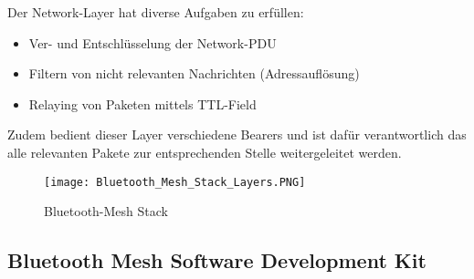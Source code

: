 Der Network-Layer hat diverse Aufgaben zu erfüllen: 

\begin{itemize}
	\item Ver- und Entschlüsselung der Network-PDU
	\item Filtern von nicht relevanten Nachrichten (Adressauflösung)
	\item Relaying von Paketen mittels TTL-Field
\end{itemize}

Zudem bedient dieser Layer verschiedene Bearers und ist dafür verantwortlich das alle relevanten Pakete zur entsprechenden Stelle weitergeleitet werden. 


\begin{figure} [H]
	\centering
	\texttt{[image: Bluetooth\_Mesh\_Stack\_Layers.PNG]}
	\caption{Bluetooth-Mesh Stack \cite{bluetooth_sig_mesh-technology-overviewpdf_2020}} 
	\label{fig:BTMeshStack}
\end{figure}


\subsection{Bluetooth Mesh Software Development Kit}\label{sec:ZigbeeSoftwareDevelopmentKit}


